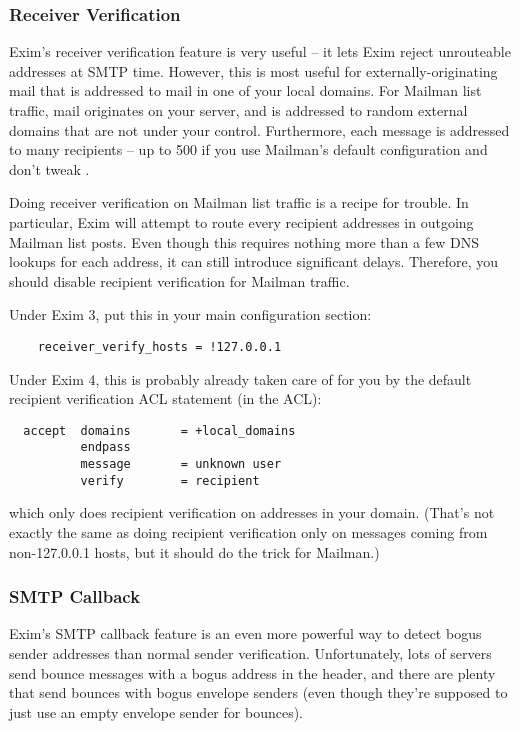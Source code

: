\documentclass{howto}
\begin{document}
\subsubsection{Receiver Verification}

Exim's receiver verification feature is very useful -- it lets Exim reject
unrouteable addresses at SMTP time.  However, this is most useful for
externally-originating mail that is addressed to mail in one of your local
domains.  For Mailman list traffic, mail originates on your server, and is
addressed to random external domains that are not under your control.
Furthermore, each message is addressed to many recipients
-- up to 500 if you use Mailman's default configuration and don't tweak
.

Doing receiver verification on Mailman list traffic is a recipe for trouble.
In particular, Exim will attempt to route every recipient addresses in
outgoing Mailman list posts.  Even though this requires nothing more than a
few DNS lookups for each address, it can still introduce significant delays.
Therefore, you should disable recipient verification for Mailman traffic.

Under Exim 3, put this in your main configuration section:

\begin{verbatim}
    receiver_verify_hosts = !127.0.0.1
\end{verbatim}

Under Exim 4, this is probably already taken care of for you by the default
recipient verification ACL statement (in the  ACL):

\begin{verbatim}
  accept  domains       = +local_domains
          endpass
          message       = unknown user
          verify        = recipient
\end{verbatim}

which only does recipient verification on addresses in your domain.  (That's
not exactly the same as doing recipient verification only on messages coming
from non-127.0.0.1 hosts, but it should do the trick for Mailman.)

\subsubsection{SMTP Callback}

Exim's SMTP callback feature is an even more powerful way to detect bogus
sender addresses than normal sender verification.  Unfortunately, lots of
servers send bounce messages with a bogus address in the header, and there are
plenty that send bounces with bogus envelope senders (even though they're
supposed to just use an empty envelope sender for bounces).
\end{document}
